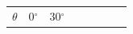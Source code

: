     
    \setlength\mytablespace{16\tabcolsep}
    \addtolength\mytablespace{9\arrayrulewidth}
    \setlength\mytablewidth{\linewidth}
        
    
    \setlength\mytableroom{\mytablewidth}
    \addtolength\mytableroom{-\mytablespace}
    
    \setlength\myfixedwidth{0pt}
    \setlength\mystarwidth{\mytableroom}
        \addtolength\mystarwidth{-\myfixedwidth}
        \divide{}
        
    
            
    
        \begin{center}
      
      \label{m39414*id89083}
      
    \noindent
      \tablelasttail{}
      \begin{xtabular*}{\mytablewidth}[t]{|p{10\mystarwidth}|p{10\mystarwidth}|p{10\mystarwidth}|p{10\mystarwidth}|p{10\mystarwidth}|p{10\mystarwidth}|p{10\mystarwidth}|p{10\mystarwidth}|}\hline
    
    
        
                  \begin{math}\theta \end{math}
                 &
    
    
        0\begin{math}{}^{\circ }\end{math} &
    
    
        30\begin{math}{}^{\circ }\end{math} &
    

\end{xtabular*}
\end{center}
